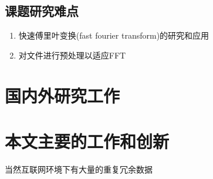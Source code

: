 \subsection{课题研究难点}
\label{sec:point2}

\begin{enumerate}
\item 快速傅里叶变换(fast fourier transform)的研究和应用

\item 对文件进行预处理以适应FFT

\end{enumerate}

\section{国内外研究工作}
\label{sec:relatedwork}

\section{本文主要的工作和创新}
\label{sec:relatedwork}

当然互联网环境下有大量的重复冗余数据
